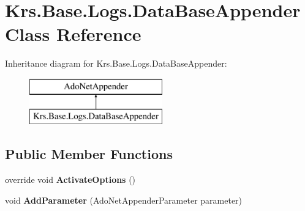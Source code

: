 \hypertarget{class_krs_1_1_base_1_1_logs_1_1_data_base_appender}{\section{Krs.\-Base.\-Logs.\-Data\-Base\-Appender Class Reference}
\label{class_krs_1_1_base_1_1_logs_1_1_data_base_appender}
}
Inheritance diagram for Krs.\-Base.\-Logs.\-Data\-Base\-Appender\-:\begin{figure}[H]
\begin{center}
\leavevmode
\includegraphics[height=2.000000cm]{class_krs_1_1_base_1_1_logs_1_1_data_base_appender}
\end{center}
\end{figure}
\subsection*{Public Member Functions}
\begin{DoxyCompactItemize}
\item 
\hypertarget{class_krs_1_1_base_1_1_logs_1_1_data_base_appender_acd39c06d7e9dbe893ab004baf1bf8acc}{override void {\bfseries Activate\-Options} ()}\label{class_krs_1_1_base_1_1_logs_1_1_data_base_appender_acd39c06d7e9dbe893ab004baf1bf8acc}

\item 
\hypertarget{class_krs_1_1_base_1_1_logs_1_1_data_base_appender_ac4491249a692ec3ec51637d717d2008f}{void {\bfseries Add\-Parameter} (Ado\-Net\-Appender\-Parameter parameter)}\label{class_krs_1_1_base_1_1_logs_1_1_data_base_appender_ac4491249a692ec3ec51637d717d2008f}

\end{DoxyCompactItemize}
